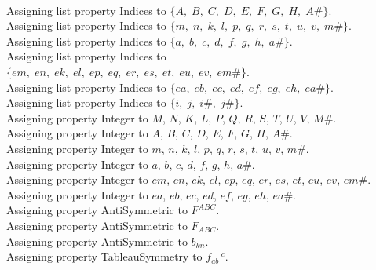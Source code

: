 \documentclass[11pt]{article}
\begin{document}
\\
Assigning list property Indices to $\{A,\; B,\; C,\; D,\; E,\; F,\; G,\; H,\; A\#\}$.
\\
Assigning list property Indices to $\{m,\; n,\; k,\; l,\; p,\; q,\; r,\; s,\; t,\; u,\; v,\; m\#\}$.
\\
Assigning list property Indices to $\{a,\; b,\; c,\; d,\; f,\; g,\; h,\; a\#\}$.
\\
Assigning list property Indices to $\{em,\; en,\; ek,\; el,\; ep,\; eq,\; er,\; es,\; et,\; eu,\; ev,\; em\#\}$.
\\
Assigning list property Indices to $\{ea,\; eb,\; ec,\; ed,\; ef,\; eg,\; eh,\; ea\#\}$.
\\
Assigning list property Indices to $\{i,\; j,\; i\#,\; j\#\}$.
\\
Assigning property Integer to $M$, $N$, $K$, $L$, $P$, $Q$, $R$, $S$, $T$, $U$, $V$, $M\#$.
\\
Assigning property Integer to $A$, $B$, $C$, $D$, $E$, $F$, $G$, $H$, $A\#$.
\\
Assigning property Integer to $m$, $n$, $k$, $l$, $p$, $q$, $r$, $s$, $t$, $u$, $v$, $m\#$.
\\
Assigning property Integer to $a$, $b$, $c$, $d$, $f$, $g$, $h$, $a\#$.
\\
Assigning property Integer to $em$, $en$, $ek$, $el$, $ep$, $eq$, $er$, $es$, $et$, $eu$, $ev$, $em\#$.
\\
Assigning property Integer to $ea$, $eb$, $ec$, $ed$, $ef$, $eg$, $eh$, $ea\#$.
\\
Assigning property AntiSymmetric to ${F}^{A B C}$.
\\
Assigning property AntiSymmetric to ${F}_{A B C}$.
\\
Assigning property AntiSymmetric to ${b}_{k n}$.
\\
Assigning property TableauSymmetry to ${f}_{a b}\,^{c}$.
\\
\end{document}
